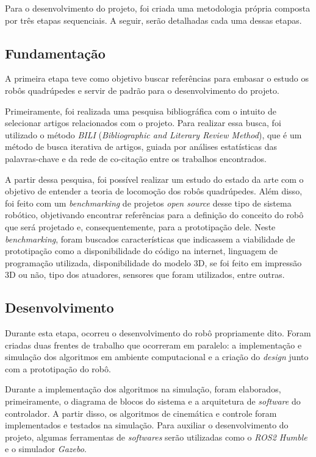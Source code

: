 \documentclass[../main.tex]{subfiles}
\begin{document}
  Para o desenvolvimento do projeto, foi criada uma metodologia própria composta por três etapas sequenciais. A seguir, serão detalhadas cada uma dessas etapas.

  \subsection{Fundamentação}
  A primeira etapa teve como objetivo buscar referências para embasar o estudo os robôs quadrúpedes e servir de padrão para o desenvolvimento do projeto.

  Primeiramente, foi realizada uma pesquisa bibliográfica com o intuito de selecionar artigos relacionados com o projeto. Para realizar essa busca, foi utilizado o método \textit{BILI} (\textit{Bibliographic and Literary Review Method}), que é um método de busca iterativa de artigos, guiada por análises estatísticas das palavras-chave e da rede de co-citação entre os trabalhos encontrados.

  A partir dessa pesquisa, foi possível realizar um estudo do estado da arte com o objetivo de entender a teoria de locomoção dos robôs quadrúpedes. Além disso, foi feito com um \textit{benchmarking} de projetos \textit{open source} desse tipo de sistema robótico, objetivando encontrar referências para a definição do conceito do robô que será projetado e, consequentemente, para a prototipação dele. Neste \textit{benchmarking}, foram buscados características que indicassem a viabilidade de prototipação como a disponibilidade do código na internet, linguagem de programação utilizada, disponibilidade do modelo 3D, se foi feito em impressão 3D ou não, tipo dos atuadores, sensores que foram utilizados, entre outras.

  \subsection{Desenvolvimento}
  Durante esta etapa, ocorreu o desenvolvimento do robô propriamente dito. Foram criadas duas frentes de trabalho que ocorreram em paralelo: a implementação e simulação dos algoritmos em ambiente computacional e a criação do \textit{design} junto com a prototipação do robô.

  Durante a implementação dos algoritmos na simulação, foram elaborados, primeiramente, o diagrama de blocos do sistema e a arquitetura de \textit{software} do controlador. A partir disso, os algoritmos de cinemática e controle foram implementados e testados na simulação. Para auxiliar o desenvolvimento do projeto, algumas ferramentas de \textit{softwares} serão utilizadas como o \textit{ROS2 Humble} e o simulador \textit{Gazebo}.
\end{document}
